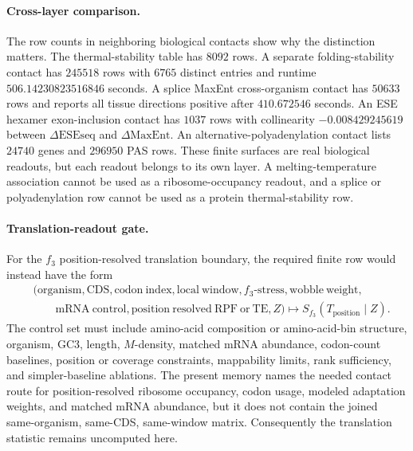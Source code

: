 \paragraph{Cross-layer comparison.}
The row counts in neighboring biological contacts show why the distinction matters.  The thermal-stability table has $8092$ rows.  A separate folding-stability contact has $245518$ rows with $6765$ distinct entries and runtime $506.14230823516846$ seconds.  A splice MaxEnt cross-organism contact has $50633$ rows and reports all tissue directions positive after $410.672546$ seconds.  An ESE hexamer exon-inclusion contact has $1037$ rows with collinearity $-0.008429245619$ between $\Delta\mathrm{ESEseq}$ and $\Delta\mathrm{MaxEnt}$.  An alternative-polyadenylation contact lists $24740$ genes and $296950$ PAS rows.  These finite surfaces are real biological readouts, but each readout belongs to its own layer.  A melting-temperature association cannot be used as a ribosome-occupancy readout, and a splice or polyadenylation row cannot be used as a protein thermal-stability row.

\paragraph{Translation-readout gate.}
For the $f_3$ position-resolved translation boundary, the required finite row would instead have the form
$$
\begin{aligned}
&(\mathrm{organism},\mathrm{CDS},\mathrm{codon\ index},\mathrm{local\ window},f_3\text{-}\mathrm{stress},\mathrm{wobble\ weight},\\
&\qquad \mathrm{mRNA\ control},\mathrm{position\ resolved\ RPF\ or\ TE},Z)
  \longmapsto S_{f_3}(T_{\mathrm{position}}\mid Z).
\end{aligned}
$$
The control set must include amino-acid composition or amino-acid-bin structure, organism, GC3, length, $M$-density, matched mRNA abundance, codon-count baselines, position or coverage constraints, mappability limits, rank sufficiency, and simpler-baseline ablations.  The present memory names the needed contact route for position-resolved ribosome occupancy, codon usage, modeled adaptation weights, and matched mRNA abundance, but it does not contain the joined same-organism, same-CDS, same-window matrix.  Consequently the translation statistic remains uncomputed here.

